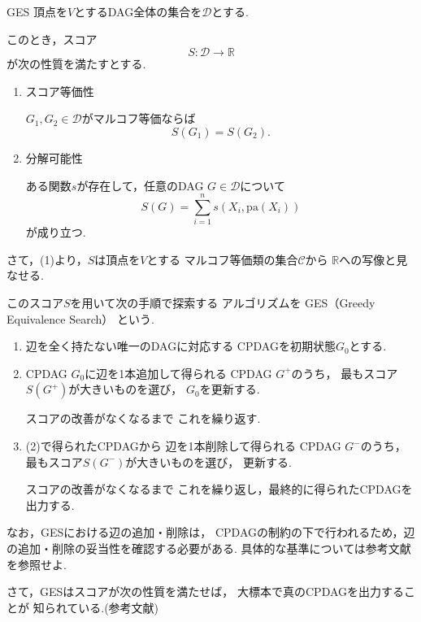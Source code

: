 \documentclass[uplatex, dvipdfmx]{jsarticle}
\begin{document}
\begin{defn}{GES}
  頂点を$V$とするDAG全体の集合を$\mathcal D$とする.

  このとき，スコア
  \[
    S:\mathcal D\longrightarrow\mathbb R
  \]
  が次の性質を満たすとする.

  \begin{enumerate}[label=(\arabic*)]
    \item スコア等価性
    
    $G_1,G_2\in\mathcal D$がマルコフ等価ならば
    \[
      S(G_1)=S(G_2).
    \]

    \item 分解可能性

    ある関数$s$が存在して，任意のDAG
    $G\in\mathcal D$について
    \[
      S(G)
      =
      \sum_{i=1}^{n}
      s(X_i,\mathrm{pa}(X_i))
    \]
    が成り立つ.
  \end{enumerate}

  さて，(1)より，$S$は頂点を$V$とする
  マルコフ等価類の集合$\mathcal C$から
  $\mathbb R$への写像と見なせる.

  このスコア$S$を用いて次の手順で探索する
  アルゴリズムを
  GES（Greedy Equivalence Search）
  という.

  \begin{enumerate}
    \item
    辺を全く持たない唯一のDAGに対応する
    CPDAGを初期状態$G_0$とする.

    \item
    CPDAG $G_0$に辺を1本追加して得られる
    CPDAG $G^+$のうち，
    最もスコア$S(G^+)$が大きいものを選び，
    $G_0$を更新する.

    スコアの改善がなくなるまで
    これを繰り返す.

    \item
    (2)で得られたCPDAGから
    辺を1本削除して得られる
    CPDAG $G^-$のうち，
    最もスコア$S(G^-)$が大きいものを選び，
    更新する.

    スコアの改善がなくなるまで
    これを繰り返し，最終的に得られたCPDAGを出力する.
  \end{enumerate}
\end{defn}

 なお，GESにおける辺の追加・削除は，
  CPDAGの制約の下で行われるため，辺の追加・削除の妥当性を確認する必要がある.
  具体的な基準については参考文献\cite{chickering2002lec}を参照せよ.

  さて，GESはスコアが次の性質を満たせば，
  大標本で真のCPDAGを出力することが
  知られている.(参考文献\cite{chickering2002})
\end{document}
